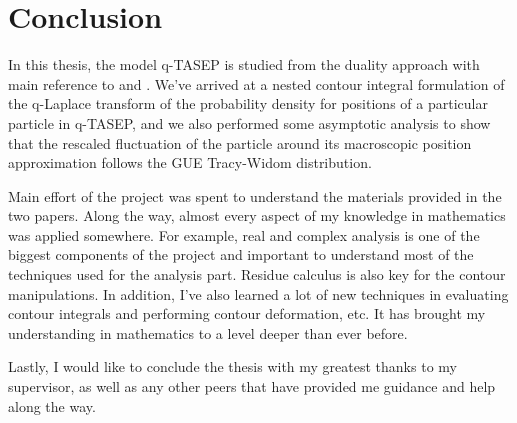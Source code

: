 \chapter{Conclusion}
In this thesis, the model q-TASEP is studied from the duality approach with main reference to \cite{duality2014} and \cite{asymptotics2013}. We've arrived at a nested contour integral formulation of the q-Laplace transform of the probability density for positions of a particular particle in q-TASEP, and we also performed some asymptotic analysis to show that the rescaled fluctuation of the particle around its macroscopic position approximation follows the GUE Tracy-Widom distribution.

Main effort of the project was spent to understand the materials provided in the two papers. Along the way, almost every aspect of my knowledge in mathematics was applied somewhere. For example, real and complex analysis is one of the biggest components of the project and important to understand most of the techniques used for the analysis part. Residue calculus is also key for the contour manipulations. In addition, I've also learned a lot of new techniques in evaluating contour integrals and performing contour deformation, etc. It has brought my understanding in mathematics to a level deeper than ever before. 

Lastly, I would like to conclude the thesis with my greatest thanks to my supervisor, as well as any other peers that have provided me guidance and help along the way. 